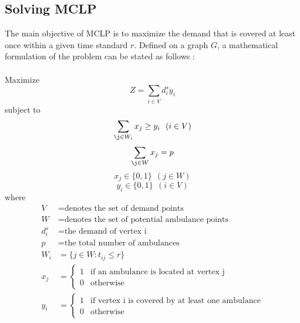 \documentclass{article}
\begin{document}
\subsection{Solving MCLP}
The main objective of MCLP is to maximize the demand that is covered at least once within a given time standard $r$. Defined on a graph $G$, a mathematical formulation of the problem can be stated as follows \cite{church1974maximal}:
\\ \\
Maximize $$Z = \sum_{i \in V} d_i^s y_i$$
subject to 
$$\sum_{\j \in W_i} x_j \geq y_i \ \ (i \in V)$$
$$\sum_{\j \in W} x_j = p$$
$$x_j \in \{0,1\} \ \ (j \in W)$$
$$y_i \in \{0,1\} \ \ (i \in V)$$
where
\begin{align*}
   V &= \text{denotes the set of demand points} \\
   W &= \text{denotes the set of potential ambulance points} \\
   d_i^s &=\text{the demand of vertex i}\\
   p &= \text{the total number of ambulances} \\
   W_{i} &= \{j \in W : t_{ij} \leq r\} \\
   x_j &= \begin{cases}
    1 &  \text{if an ambulance is located at vertex j} \\
    0 &  \text{otherwise}
   \end{cases} \\
   y_i &= \begin{cases}
    1 &  \text{if vertex i is covered by at least one ambulance} \\
    0 &  \text{otherwise}
   \end{cases}
\end{align*}
\end{document}
